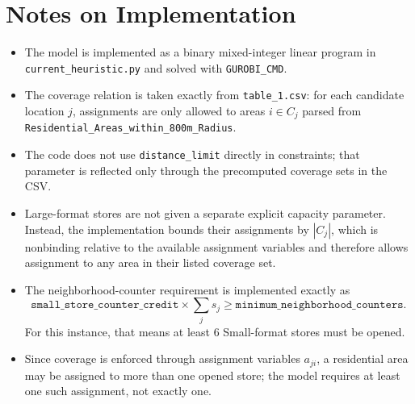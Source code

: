 \section*{Notes on Implementation}

\begin{itemize}
  \item The model is implemented as a binary mixed-integer linear program in \texttt{current\_heuristic.py} and solved with \texttt{GUROBI\_CMD}.
  \item The coverage relation is taken exactly from \texttt{table\_1.csv}: for each candidate location $j$, assignments are only allowed to areas $i \in C_j$ parsed from \texttt{Residential\_Areas\_within\_800m\_Radius}.
  \item The code does not use \texttt{distance\_limit} directly in constraints; that parameter is reflected only through the precomputed coverage sets in the CSV.
  \item Large-format stores are not given a separate explicit capacity parameter. Instead, the implementation bounds their assignments by $|C_j|$, which is nonbinding relative to the available assignment variables and therefore allows assignment to any area in their listed coverage set.
  \item The neighborhood-counter requirement is implemented exactly as
  \[
  \texttt{small\_store\_counter\_credit} \times \sum_j s_j \ge \texttt{minimum\_neighborhood\_counters}.
  \]
  For this instance, that means at least $6$ Small-format stores must be opened.
  \item Since coverage is enforced through assignment variables $a_{ji}$, a residential area may be assigned to more than one opened store; the model requires at least one such assignment, not exactly one.
\end{itemize}
